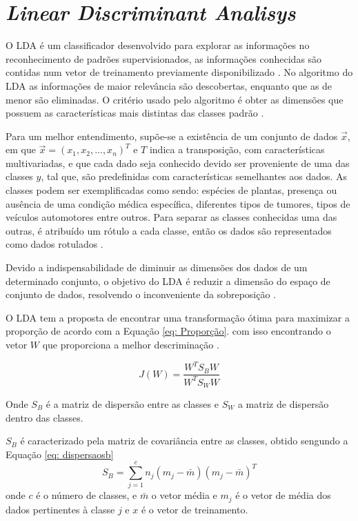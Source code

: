 \section{\textit{Linear Discriminant Analisys}}
O LDA é um classificador desenvolvido para explorar as informações no reconhecimento de padrões supervisionados,
as informações conhecidas são contidas num vetor de treinamento previamente disponibilizado \cite{izenmanLDA}.
No algoritmo do LDA as informações de maior relevância são descobertas, enquanto que as de menor são 
eliminadas. O critério usado pelo algoritmo é obter as dimensões que possuem as características mais
distintas das classes padrão \cite{korkmaz2017expert}.

Para um melhor entendimento, supõe-se a existência de um conjunto de dados $\vec x$, em que $\vec x = (x_1, x_2,...,x_n)^T$
e $T$ indica a transposição, com características multivariadas, e que cada dado
seja conhecido devido ser proveniente de uma das  classes $y$, tal que, são predefinidas com características
semelhantes aos dados. As classes podem ser exemplificadas como sendo: espécies de plantas,
presença ou ausência de uma condição médica específica, diferentes tipos de tumores, tipos de veículos automotores
entre outros. Para separar as classes conhecidas uma das outras, é atribuído um rótulo a cada classe, então os dados são
representados como dados rotulados \cite{izenmanLDA}.


Devido a indispensabilidade de diminuir as dimensões dos dados de um determinado conjunto, o objetivo do LDA
é reduzir a dimensão do espaço de conjunto de dados, resolvendo o inconveniente da sobreposição \cite{SinghLDA}.

O LDA tem a proposta de encontrar uma transformação ótima para maximizar a proporção de acordo com a Equação \ref{eq: Proporção}.
com isso encontrando o vetor $W$ que proporciona a melhor descriminação \cite{ketsuwan2017linear}.

\begin{equation}
	\label{eq: Proporção}
	J(W) = \frac { W^T S_B W}{W^T S_W W}
\end{equation}

Onde $S_B$ é a matriz de dispersão entre as classes e $ S_W$ a matriz de dispersão dentro das classes. 

$S_B$ é caracterizado pela matriz de covariância entre as classes, obtido sengundo a Equação \ref{eq: dispersaosb} 
\begin{equation}
	\label{eq: dispersaosb}
	 S_B = \sum_{j=1}^{c} n_j(m_j - \bar m)(m_j -\bar m)^T 
\end{equation}
onde $c$ é o número de classes, e $\bar m$ o vetor média e  $m_j$ é o vetor de média dos dados 
pertinentes à classe $j$ e $x$ é o vetor de treinamento.

